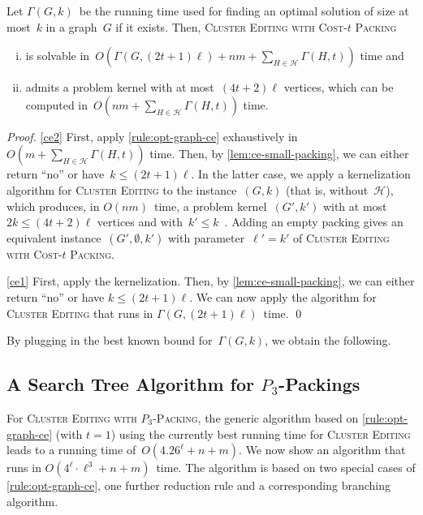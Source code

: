 \documentclass[envcountsame,numbook,smallextended]{svjour3}
\numberwithin{equation}{section}
\numberwithin{figure}{section}
\newcommand{\packing}{\ensuremath{\mathcal H}}
\newcommand{\CEGP}{\textsc{Cluster Editing with  Cost-$t$ Packing}}
\newcommand{\CEPP}{\textsc{Cluster Editing with  $P_3$-Packing}}
\newcommand{\Time}{\ensuremath{\Gamma}}
\begin{document}
\begin{theorem}\label{thm:ce-time}
Let $\Time(G,k)$~be the running time used for finding an optimal solution of size at most~\(k\) in a graph~\(G\) if it exists. Then,  \CEGP{}
\begin{enumerate}[(i)]
\item\label{ce1} is solvable in~$O(\Time(G,(2t+1)\ell) +
  nm+\sum_{H\in \packing}\Time(H,t))$ time and
\item\label{ce2} admits a problem kernel with at most~$(4t+2)\ell$ vertices, which can be computed in~$O(nm+\sum_{H\in \packing}\Time(H,t))$ time.
\end{enumerate}
\end{theorem}
\begin{proof}
  \eqref{ce2}
  First, apply \cref{rule:opt-graph-ce} exhaustively
  in~$O(m+\sum_{H\in \packing}\Time(H,t))$ time.
  Then,
  by \cref{lem:ce-small-packing},
  we can either return ``no''
  or have~$k\le (2t+1)\ell$.
  In the latter case,
  we apply a kernelization algorithm
  for \textsc{Cluster Editing} to the instance~$(G,k)$
  (that is, without~$\packing$),
  which produces, in $O(nm)$~time,
  a problem kernel~$(G',k')$
  with at most~$2k\le (4t+2)\ell$ vertices
  and with~$k'\le k$~\cite{CM12}.
  Adding an empty packing gives
  an equivalent instance~$(G',\emptyset,k')$
  with parameter~$\ell'=k'$ of \CEGP.

  \eqref{ce1} First, apply the kernelization.
  Then, by \cref{lem:ce-small-packing},
  we can either return ``no''
  or have $k\le (2t+1)\ell$.
  We can now apply the algorithm
  for \textsc{Cluster Editing}
  that runs in $\Time(G,(2t+1)\ell)$~time. \qed\end{proof} 
By plugging in the best known bound for~$\Time(G,k)$,
we obtain the following.


\subsection{A Search Tree Algorithm for $P_3$-Packings}
\label{sec:p3p}
For \CEPP,
the generic algorithm based on \cref{rule:opt-graph-ce}
(with $t=1$)
using the currently best running time
for \textsc{Cluster Editing}
leads to a running time of~$O(4.26^\ell+n+m)$.
We now show an algorithm that runs
in \(O(4^\ell\cdot \ell^3 + n + m)\)~time.
The algorithm is based on two special cases
of \cref{rule:opt-graph-ce},
one further reduction rule
and a corresponding branching algorithm.
\end{document}
